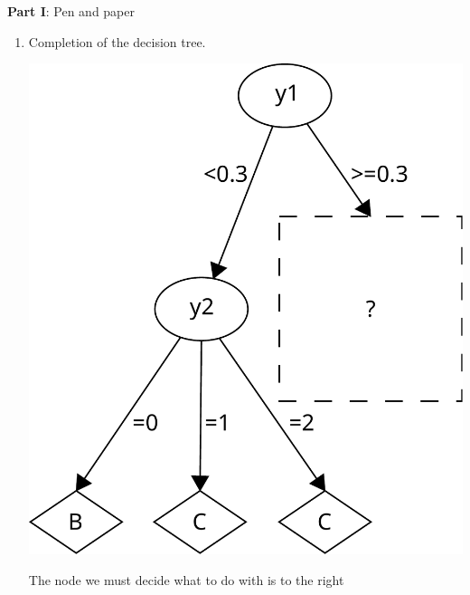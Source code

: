 \documentclass{article}
\begin{document}
\setcounter{page}{0}
\thispagestyle{empty}
\renewcommand{\thesection}{\Roman{section}}

\newpage




\large{\textbf{Part I}: Pen and paper}\normalsize




\begin{enumerate}[leftmargin=\labelsep]
\item Completion of the decision tree.

\vspace{3pt}

\begin{minipage}{0.4\textwidth}
  \includegraphics[scale = 0.3, left]{img/decision_tree_1.pdf}
\end{minipage}
\hspace{0.05\textwidth}
\begin{minipage}{0.6\textwidth}
  The node we must decide what to do with is to the right

\end{minipage}
\end{enumerate}
\end{document}
